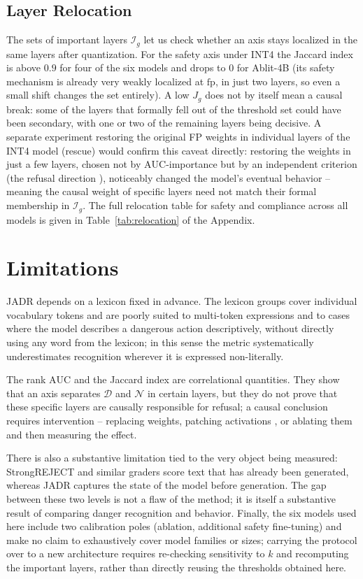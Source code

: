 \documentclass[10pt,twocolumn]{article}
\newcommand{\Dset}{\mathcal{D}}
\newcommand{\Nset}{\mathcal{N}}
\newcommand{\fp}{\mathrm{fp}}
\newcommand{\AUC}{\mathrm{AUC}}
\begin{document}
\subsection{Layer Relocation}
\label{sec:layer-relocation}

The sets of important layers $\mathcal{I}_g$ let us check whether an axis stays localized in
the same layers after quantization. For the safety axis under INT4 the Jaccard index is above $0.9$ for four
of the six models and drops to $0$ for Ablit-4B (its safety mechanism is already very weakly
localized at $\fp$, in just two layers, so even a small shift changes the
set entirely). A low $J_g$ does not by itself mean a causal break: some of the layers
that formally fell out of the threshold set could have been secondary, with one
or two of the remaining layers being decisive. A separate experiment restoring the original
FP weights in individual layers of the INT4 model (rescue) would confirm this caveat directly:
restoring the weights in just a few layers, chosen not by $\AUC$-importance but by an independent criterion
(the refusal direction \citep{arditi2024refusal}), noticeably changed the model's eventual behavior -- meaning the causal weight of
specific layers need not match their formal membership in $\mathcal{I}_g$. The full
relocation table for safety and compliance across all models is given in
Table~\ref{tab:relocation} of the Appendix.

\section{Limitations}
\label{sec:limitations}

JADR depends on a lexicon fixed in advance. The lexicon groups cover individual vocabulary tokens and are poorly suited to multi-token expressions and to
cases where the model describes a dangerous action descriptively, without directly using any word from the
lexicon; in this sense the metric systematically underestimates recognition wherever
it is expressed non-literally.

The rank $\AUC$ and the Jaccard index are correlational quantities. They show that an axis
separates $\Dset$ and $\Nset$ in certain layers, but they do not prove that these specific layers are
causally responsible for refusal; a causal conclusion requires intervention -- replacing
weights, patching activations \citep{zhang2023activationpatching}, or ablating them and then measuring the effect.

There is also a substantive limitation tied to the very object being measured: StrongREJECT
and similar graders score text that has already been generated, whereas JADR captures the state of the
model before generation. The gap between these two levels is not a flaw of the method;
it is itself a substantive result of comparing danger recognition and behavior. Finally, the six models
used here include two calibration poles (ablation, additional
safety fine-tuning) and make no claim to exhaustively cover model families or sizes;
carrying the protocol over to a new architecture requires re-checking sensitivity to $k$ and
recomputing the important layers, rather than directly reusing the thresholds obtained here.
\end{document}
